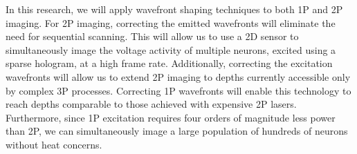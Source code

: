 In this research, we will apply wavefront shaping techniques to both 1P and 2P imaging. For 2P imaging, correcting the emitted wavefronts will eliminate the need for sequential scanning. This will allow us to use a 2D sensor to simultaneously image the voltage activity of multiple neurons, excited using a sparse hologram, at a high frame rate. Additionally, correcting the excitation wavefronts will allow us to extend 2P imaging to depths currently accessible only by complex 3P processes. Correcting 1P wavefronts will enable this technology to reach depths comparable to those achieved with expensive 2P lasers. %
 Furthermore, since 1P excitation requires four orders of magnitude less power than 2P, we can simultaneously image a large population of hundreds of neurons without heat concerns.

